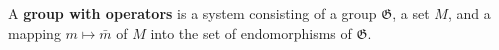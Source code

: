A \textbf{group with operators} is a system consisting of a group $\mathfrak{G}$, a set $M$, and a mapping $m \mapsto \bar{m}$ of $M$ into the set of endomorphisms of $\mathfrak{G}$.
